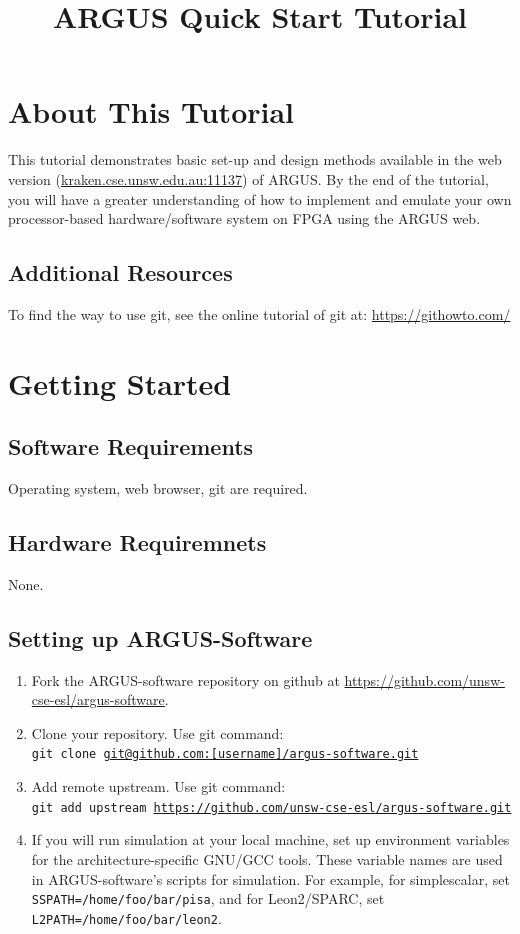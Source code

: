 \documentclass[a4paper,10pt]{article}
\begin{document}
\title{ARGUS Quick Start Tutorial}

\maketitle

\newpage
\section*{About This Tutorial}
 This tutorial demonstrates basic set-up and design methods available in the web version (\url{kraken.cse.unsw.edu.au:11137}) 
of ARGUS. By the end of the tutorial, you will have a greater understanding of how to
implement and emulate your own processor-based hardware/software system on FPGA using the ARGUS web.

\subsection*{Additional Resources}
To find the way to use git, see the online tutorial of git at:\newline
\url{https://githowto.com/}

\newpage

\section{Getting Started}

\subsection{Software Requirements}
Operating system, web browser, git are required.

\subsection{Hardware Requiremnets}
None.

\subsection{Setting up ARGUS-Software}
\begin{enumerate}
\item Fork the ARGUS-software repository on github at \url{https://github.com/unsw-cse-esl/argus-software}.
\item Clone your repository. Use git command:\\ 
\texttt{git clone \url{git@github.com:[username]/argus-software.git}}
\item Add remote upstream. Use git command:\\
\texttt{git add upstream \url{https://github.com/unsw-cse-esl/argus-software.git}}
\item If you will run simulation at your local machine, set up environment variables for the architecture-specific GNU/GCC tools. These variable names are used in ARGUS-software's scripts for simulation. For example, for simplescalar, set \texttt{SSPATH=/home/foo/bar/pisa}, and
for Leon2/SPARC, set \texttt{L2PATH=/home/foo/bar/leon2}.
\end{enumerate}
\end{document}
